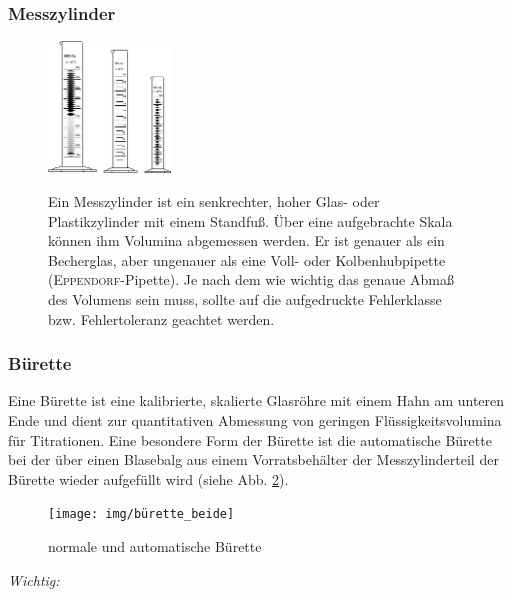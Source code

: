 \subsubsection*{Messzylinder}
\begin{figure}[h!]
	\begin{minipage}[b]{.2\textwidth} %
			\centering
		\includegraphics[height=3.5cm]{img/Messzylinder}
		\label{fig:messzylinder}
	\end{minipage}
	\hspace{.1\linewidth}%
	\begin{minipage}[b]{.7\textwidth} %
	Ein Messzylinder ist ein senkrechter, hoher Glas- oder Plastikzylinder mit einem Standfuß. Über eine aufgebrachte Skala können ihm Volumina abgemessen werden. Er ist genauer als ein Becherglas, aber ungenauer als eine Voll- oder Kolbenhubpipette (\textsc{Eppendorf}-Pipette). Je nach dem wie wichtig das genaue Abmaß des Volumens sein muss, sollte auf die aufgedruckte Fehlerklasse bzw. Fehlertoleranz geachtet werden.
	\end{minipage}
\end{figure}
\FloatBarrier

\subsubsection*{Bürette}
Eine Bürette ist eine kalibrierte, skalierte Glasröhre mit einem Hahn am unteren Ende und dient zur quantitativen Abmessung von geringen Flüssigkeitsvolumina für Titrationen. Eine besondere Form der Bürette ist die automatische Bürette bei der über einen Blasebalg aus einem Vorratsbehälter der Messzylinderteil der Bürette wieder aufgefüllt wird (siehe Abb. \ref{fig:bürette}).

\begin{figure}[h!]
	\centering
	\texttt{[image: img/bürette\_beide]}
	\caption{normale und automatische Bürette}
	\label{fig:bürette}
\end{figure}
\FloatBarrier

\textit{Wichtig:}\\
\vspace*{-5mm}

